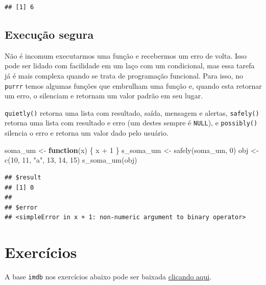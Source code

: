 \documentclass[
]{book}
\newenvironment{Shaded}{\begin{snugshade}}{\end{snugshade}}
\newcommand{\ControlFlowTok}[1]{\textcolor[rgb]{0.13,0.29,0.53}{\textbf{#1}}}
\newcommand{\DecValTok}[1]{\textcolor[rgb]{0.00,0.00,0.81}{#1}}
\newcommand{\FunctionTok}[1]{\textcolor[rgb]{0.00,0.00,0.00}{#1}}
\newcommand{\NormalTok}[1]{#1}
\newcommand{\OtherTok}[1]{\textcolor[rgb]{0.56,0.35,0.01}{#1}}
\newcommand{\SpecialCharTok}[1]{\textcolor[rgb]{0.00,0.00,0.00}{#1}}
\newcommand{\StringTok}[1]{\textcolor[rgb]{0.31,0.60,0.02}{#1}}
\begin{document}
\begin{verbatim}
## [1] 6
\end{verbatim}

\hypertarget{execuuxe7uxe3o-segura}{%
\subsection{Execução segura}\label{execuuxe7uxe3o-segura}}

Não é incomum executarmos uma função e recebermos um erro de volta. Isso pode ser
lidado com facilidade em um laço com um condicional, mas essa tarefa já é mais
complexa quando se trata de programação funcional. Para isso, no \texttt{purrr} temos
algumas funções que embrulham uma função e, quando esta retornar um erro, o
silenciam e retornam um valor padrão em seu lugar.

\texttt{quietly()} retorna uma lista com resultado, saída, mensagem e alertas, \texttt{safely()}
retorna uma lista com resultado e erro (um destes sempre é \texttt{NULL}), e \texttt{possibly()}
silencia o erro e retorna um valor dado pelo usuário.

\begin{Shaded}
\begin{Highlighting}[]
\NormalTok{soma\_um }\OtherTok{\textless{}{-}} \ControlFlowTok{function}\NormalTok{(x) \{ x }\SpecialCharTok{+} \DecValTok{1}\NormalTok{ \}}
\NormalTok{s\_soma\_um }\OtherTok{\textless{}{-}} \FunctionTok{safely}\NormalTok{(soma\_um, }\DecValTok{0}\NormalTok{)}
\NormalTok{obj }\OtherTok{\textless{}{-}} \FunctionTok{c}\NormalTok{(}\DecValTok{10}\NormalTok{, }\DecValTok{11}\NormalTok{, }\StringTok{"a"}\NormalTok{, }\DecValTok{13}\NormalTok{, }\DecValTok{14}\NormalTok{, }\DecValTok{15}\NormalTok{)}
\FunctionTok{s\_soma\_um}\NormalTok{(obj)}
\end{Highlighting}
\end{Shaded}

\begin{verbatim}
## $result
## [1] 0
## 
## $error
## <simpleError in x + 1: non-numeric argument to binary operator>
\end{verbatim}

\hypertarget{exercuxedcios-23}{%
\section{Exercícios}\label{exercuxedcios-23}}

A base \texttt{imdb} nos exercícios abaixo pode ser baixada \href{https://github.com/curso-r/livro-material/raw/master/assets/data/imdb.rds}{clicando aqui}.
\end{document}
